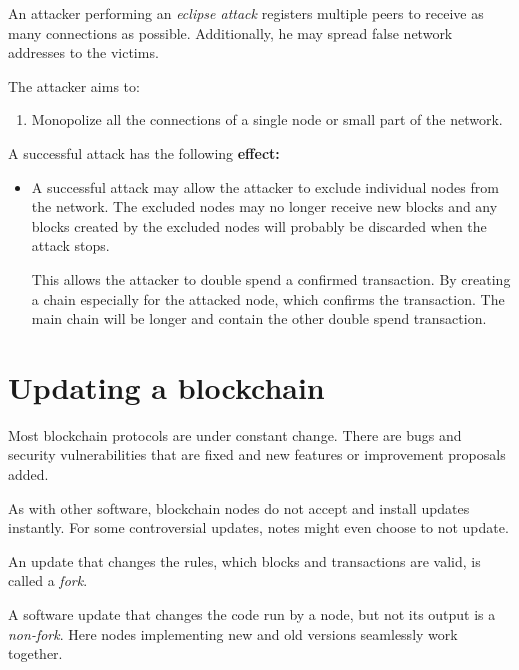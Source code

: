 \begin{definition}
	An attacker performing an \emph{eclipse attack} registers multiple peers to receive as many connections as possible. Additionally, he may spread false network addresses to the victims. 
	
The attacker aims to:
\begin{enumerate}[label=\Roman*]
	\item Monopolize all the connections of a single node or small part of the network.
\end{enumerate}
\end{definition}

\begin{note}
A successful attack has the following \textbf{effect:}
\begin{itemize}
	\item A successful attack may allow the attacker to exclude individual nodes from the network. The excluded nodes may no longer receive new blocks and any blocks created by the excluded nodes will probably be discarded when the attack stops.

This allows the attacker to double spend a confirmed transaction. By creating a chain especially for the attacked node, which confirms the transaction. The main chain will be longer and contain the other double spend transaction.
\end{itemize}	
\end{note}

\section{Updating a blockchain}
\label{sec:update}
Most blockchain protocols are under constant change. There are bugs and security vulnerabilities that are fixed and new features or improvement proposals added. 

As with other software, blockchain nodes do not accept and install updates instantly. For some controversial updates, notes might even choose to not update.


\begin{definition} An update that changes the rules, which blocks and transactions are valid, is called a \emph{fork}.
\end{definition}

\begin{note}
A software update that changes the code run by a node, but not its output is a \emph{non-fork}. Here nodes implementing new and old versions seamlessly work together.	
\end{note}

